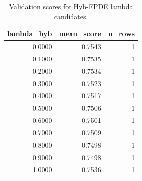 \begin{table}[t]
\caption{Validation scores for Hyb-FPDE lambda candidates.}
\label{tab:lambda_distribution_computed}
\centering
\begin{tabular}{rrr}
\toprule
lambda\_hyb & mean\_score & n\_rows \\
\midrule
0.0000 & 0.7543 & 1 \\
0.1000 & 0.7535 & 1 \\
0.2000 & 0.7534 & 1 \\
0.3000 & 0.7523 & 1 \\
0.4000 & 0.7517 & 1 \\
0.5000 & 0.7506 & 1 \\
0.6000 & 0.7501 & 1 \\
0.7000 & 0.7509 & 1 \\
0.8000 & 0.7498 & 1 \\
0.9000 & 0.7498 & 1 \\
1.0000 & 0.7536 & 1 \\
\bottomrule
\end{tabular}

\end{table}

